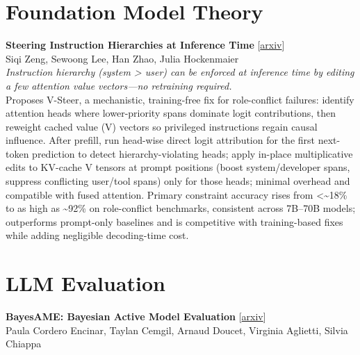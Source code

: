 \documentclass[12pt,letterpaper]{article}
\begin{document}
\medskip


\section*{Foundation Model Theory}

{\small\textbf{Steering Instruction Hierarchies at Inference Time}} {\scriptsize[\href{https://arxiv.org/abs/2607.26228}{arxiv}]}\\
{\scriptsize Siqi Zeng, Sewoong Lee, Han Zhao, Julia Hockenmaier}\\

{\small\textit{Instruction hierarchy (system > user) can be enforced at inference time by editing a few attention value vectors---no retraining required.}}\\[1pt]
{\footnotesize Proposes V-Steer, a mechanistic, training-free fix for role-conflict failures: identify attention heads where lower-priority spans dominate logit contributions, then reweight cached value (V) vectors so privileged instructions regain causal influence. After prefill, run head-wise direct logit attribution for the first next-token prediction to detect hierarchy-violating heads; apply in-place multiplicative edits to KV-cache V tensors at prompt positions (boost system/developer spans, suppress conflicting user/tool spans) only for those heads; minimal overhead and compatible with fused attention. Primary constraint accuracy rises from <\textasciitilde{}18\% to as high as \textasciitilde{}92\% on role-conflict benchmarks, consistent across 7B--70B models; outperforms prompt-only baselines and is competitive with training-based fixes while adding negligible decoding-time cost.}

\medskip


\section*{LLM Evaluation}

{\small\textbf{BayesAME: Bayesian Active Model Evaluation}} {\scriptsize[\href{https://arxiv.org/abs/2607.27023}{arxiv}]}\\
{\scriptsize Paula Cordero Encinar, Taylan Cemgil, Arnaud Doucet, Virginia Aglietti, Silvia Chiappa}\\
\end{document}
